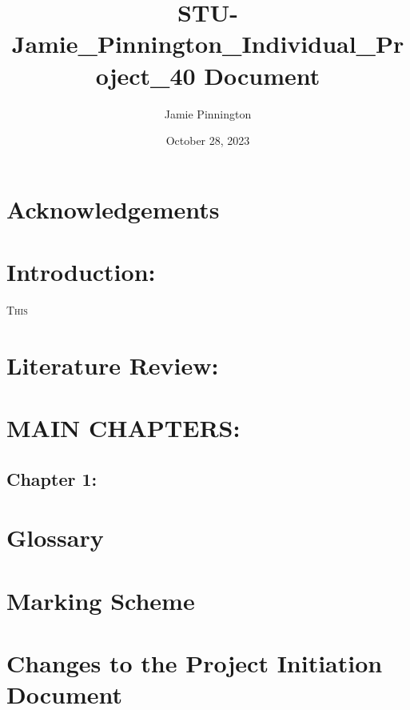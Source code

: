 \documentclass[journal, draftcls]{IEEEtran}
\title{STU-Jamie_Pinnington_Individual_Project_40 Document}
\author{Jamie Pinnington}
\date{October 28, 2023}
\begin{document}
\pagestyle{IEEEtran} %



\clearpage %

\begin{abstract}
\end{abstract}

\section*{Acknowledgements}
\clearpage %

\tableofcontents
\clearpage %

\listoffigures
\clearpage %

\listoftables
\clearpage %

\section{Introduction:}

\lettrine[lines=2]{T}{his}

\section{Literature Review:}


\printbibliography

\section{MAIN CHAPTERS:}
\subsection{Chapter 1:}

\newpage
\onecolumn
\section{Glossary}
\renewcommand{\thepage}{A\arabic{page}}
\newpage
\section{Marking Scheme}
\renewcommand{\thepage}{B\arabic{page}}
\newpage
\section{Changes to the Project Initiation Document}
\renewcommand{\thepage}{C\arabic{page}}
\newpage
\end{document}
